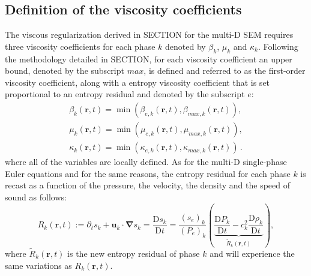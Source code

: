 \documentclass[preprint,10pt]{elsarticle}
\newcommand{\grad}{\mbold{\nabla}}
\newcommand{\mbold}[1]{\boldsymbol#1}
\newcommand{\resi}{R}
\newcommand{\resinew}{\widetilde{\resi}}
\newcommand{\matder}[1]{\frac{\textrm{D} #1}{\textrm{D} t}}
\begin{document}
\subsection{Definition of the viscosity coefficients}\label{sec:visc-coeff-sem}
The viscous regularization derived in SECTION for the multi-D SEM requires three viscosity coefficients for each phase $k$ denoted by $\beta_k$, $\mu_k$ and $\kappa_k$. Following the methodology detailed in SECTION, for each viscosity coefficient an upper bound, denoted by the subscript $max$, is defined and referred to as the first-order viscosity coefficient, along with a entropy viscosity coefficient that is set proportional to an entropy residual and denoted by the subscript $e$:
%
\begin{align}\label{eq:def-visc-sem-sct4}
\beta_k( \mbold r, t) = \min \left( \beta_{e,k}( \mbold r, t), \beta_{max,k} ( \mbold r, t) \right), \nonumber \\
\mu_k( \mbold r, t) = \min \left( \mu_{e,k}( \mbold r, t), \mu_{max,k} ( \mbold r, t) \right), \nonumber \\
\kappa_k( \mbold r, t) = \min \left( \kappa_{e,k}( \mbold r, t), \kappa_{max,k} ( \mbold r, t) \right) \,. \nonumber
\end{align}
% 
where all of the variables are locally defined. As for the multi-D single-phase Euler equations and for the same reasons, the entropy residual for each phase $k$ is recast as a function of the pressure, the velocity, the density and the speed of sound as follows:
%
\begin{equation}\label{eq:ent_res-sem-sct4}
\resi_k(\mbold r,t) := \partial_t s_k + \mbold u_k \cdot \grad s_k = \matder{s_k} = \frac{(s_e)_k}{(P_e)_k} \left( \underbrace{\matder{P_k} - c_k^2 \matder{\rho_k} }_{\resinew_k(\mbold r,t)} \right) ,
\end{equation} 
%
where $\resinew_k(\mbold r,t)$ is the new entropy residual of phase $k$ and will experience the same variations as $\resi_k(\mbold r,t)$. 
\end{document}
